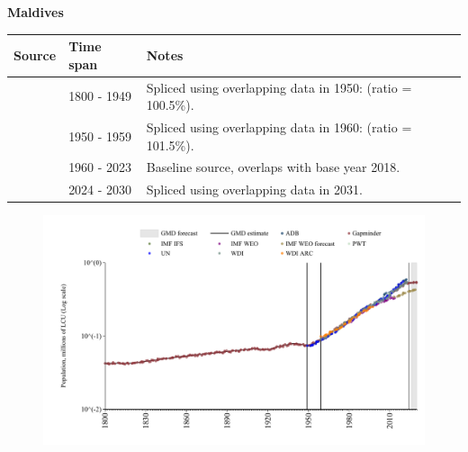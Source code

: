 \documentclass[12pt,a4paper,landscape]{article}
\begin{document}
\begin{adjustbox}{max totalsize={\paperwidth}{\paperheight},center}
\begin{minipage}[t][\textheight][t]{\textwidth}
\vspace*{0.5cm}
{}
\begin{center}
{\Large\bfseries Maldives}
\end{center}
\vspace{0.5cm}
\begin{table}[H]
\centering
\small
\begin{tabular}{|l|l|l|}
\hline
\textbf{Source} & \textbf{Time span} & \textbf{Notes} \\
\hline
\rowcolor{white}\cite{Gapminder}& 1800 - 1949 &Spliced using overlapping data in 1950: (ratio = 100.5\%).\\
\rowcolor{lightgray}\cite{IMF_IFS}& 1950 - 1959 &Spliced using overlapping data in 1960: (ratio = 101.5\%).\\
\rowcolor{white}\cite{WDI}& 1960 - 2023 &Baseline source, overlaps with base year 2018.\\
\rowcolor{lightgray}\cite{Gapminder}& 2024 - 2030 &Spliced using overlapping data in 2031.\\
\hline
\end{tabular}
\end{table}
\begin{figure}[H]
\centering
\includegraphics[width=\textwidth,height=0.6\textheight,keepaspectratio]{graphs/MDV_pop.pdf}
\end{figure}
\end{minipage}
\end{adjustbox}
\end{document}
